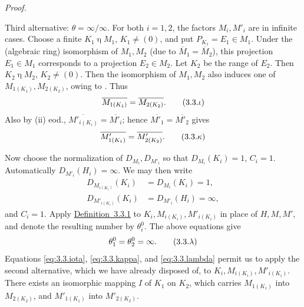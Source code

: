 \documentclass[b5paper,twoside]{article}
\newcommand{\defref}[2]{\hyperref[#1]{\mbox{Definition~#2}}}
\theoremstyle{mvnplain}
\renewenvironment{proof}[1][Proof]{%
  \par\addvspace{0.35\baselineskip}%
  \noindent\textit{#1.}\ \normalfont\ignorespaces
}{%
  \par\addvspace{0.35\baselineskip}%
}
\newcommand{\M}{\mathbf M}
\newcommand{\Hilbert}{\mathfrak H}
\def\M{M}%
\def\Hilbert{H}%
\def\mathfrak#1{#1}%
\begin{document}
\begin{proof}
Third alternative: \(\theta=\infty/\infty\). For both \(i=1,2\), the
factors \(\M_i,\M'_i\) are in infinite cases. Choose a finite
\(\mathfrak K_1\mathrel{\eta}\M_1\), \(\mathfrak K_1\ne(0)\), and put
\(P_{\mathfrak K_1}=E_1\in\M_1\). Under the (algebraic ring) isomorphism of
\(\M_1,\M_2\) (due to \(\overline{\M}_1=\overline{\M}_2\)), this projection
\(E_1\in\M_1\) corresponds to a projection \(E_2\in\M_2\). Let
\(\mathfrak K_2\) be the range of \(E_2\). Then
\(\mathfrak K_2\mathrel{\eta}\M_2\), \(\mathfrak K_2\ne(0)\). Then the isomorphism of
\(\M_1,\M_2\) also induces one of
\(\M_{1(\mathfrak K_1)},\M_{2(\mathfrak K_2)}\), owing to
\cite[p.~187, Lemma~11.3.3(i)]{ref5}. Thus
\begin{equation}
  \overline{\M_{1(\mathfrak K_1)}}
  =\overline{\M_{2(\mathfrak K_2)}}.
  \tag{3.3.\ensuremath{\iota}}\label{eq:3.3.iota}
\end{equation}
Also by (ii) eod.,
\(\overline{\M'_{i(\mathfrak K_i)}}=\overline{\M'_i}\); hence
\(\overline{\M'_1}=\overline{\M'_2}\) gives
\begin{equation}
  \overline{\M'_{1(\mathfrak K_1)}}
  =\overline{\M'_{2(\mathfrak K_2)}}.
  \tag{3.3.\ensuremath{\kappa}}\label{eq:3.3.kappa}
\end{equation}

Now choose the normalization of \(D_{\M_i},D_{\M'_i}\) so that
\(D_{\M_i}(\mathfrak K_i)=1\), \(C_i=1\). Automatically
\(D_{\M'_i}(\Hilbert_i)=\infty\). We may then write
\[
\begin{aligned}
D_{\M_{i(\mathfrak K_i)}}(\mathfrak K_i)
  &=D_{\M_i}(\mathfrak K_i)=1,\\
D_{\M'_{i(\mathfrak K_i)}}(\mathfrak K_i)
  &=D_{\M'_i}(\Hilbert_i)=\infty,
\end{aligned}
\]
and \(C_i=1\). Apply \defref{def:3.3.1}{3.3.1} to
\(\mathfrak K_i,\M_{i(\mathfrak K_i)},\M'_{i(\mathfrak K_i)}\) in place of
\(\Hilbert,\M,\M'\), and denote the resulting number by \(\theta_i^0\). The
above equations give
\begin{equation}
  \theta_1^0=\theta_2^0=\infty.
  \tag{3.3.\ensuremath{\lambda}}\label{eq:3.3.lambda}
\end{equation}
Equations \eqref{eq:3.3.iota}, \eqref{eq:3.3.kappa}, and
\eqref{eq:3.3.lambda} permit us to apply the second alternative, which we have
already disposed of, to
\(\mathfrak K_i,\M_{i(\mathfrak K_i)},\M'_{i(\mathfrak K_i)}\). There exists
an isomorphic mapping \(\mathfrak I\) of \(\mathfrak K_1\) on
\(\mathfrak K_2\), which carries \(\M_{1(\mathfrak K_1)}\) into
\(\M_{2(\mathfrak K_2)}\), and \(\M'_{1(\mathfrak K_1)}\) into
\(\M'_{2(\mathfrak K_2)}\).


\end{proof}
\end{document}
